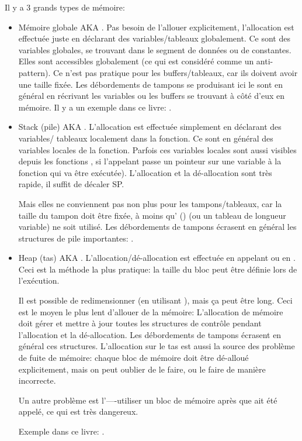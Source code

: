 ﻿

Il y a 3 grands types de mémoire:

\begin{itemize}
\item
Mémoire globale \ac{AKA} .
Pas besoin de l'allouer explicitement, l'allocation est effectuée juste en déclarant
des variables/tableaux globalement.
Ce sont des variables globales, se trouvant dans le segment de données ou de constantes.
Elles sont accessibles globalement (ce qui est considéré comme un \gls{anti-pattern}).
Ce n'est pas pratique pour les buffers/tableaux, car ils doivent avoir une taille
fixée.
Les débordements de tampons se produisant ici le sont en général en récrivant les
variables ou les buffers se trouvant à côté d'eux en mémoire.
Il y a un exemple dans ce livre: .

\item
Stack (pile) \ac{AKA} .
L'allocation est effectuée simplement en déclarant des variables/ tableaux localement
dans la fonction.
Ce sont en général des variables locales de la fonction.
Parfois ces variables locales sont aussi visibles depuis les fonctions ,
si l'appelant passe un pointeur sur une variable à la fonction 
qui va être exécutée).
L'allocation et la dé-allocation sont très rapide, il suffit de décaler \ac{SP}.

Mais elles ne conviennent pas non plus pour les tampons/tableaux, car la taille du
tampon doit être fixée, à moins qu' () (ou un tableau de
longueur variable) ne soit utilisé.
Les débordements de tampons écrasent en général les structures de pile importantes:
.

\item
Heap (tas) \ac{AKA} .
L'allocation/dé-allocation est effectuée en appelant  ou
 en \Cpp.
Ceci est la méthode la plus pratique: la taille du bloc peut être définie lors de
l'exécution.

Il est possible de redimensionner (en utilisant ), mais ça peut
être long.
Ceci est le moyen le plus lent d'allouer de la mémoire:
L'allocation de mémoire doit gérer et mettre à jour toutes les structures de
contrôle pendant l'allocation et la dé-allocation.
Les débordements de tampons écrasent en général ces structures.
L'allocation sur le tas est aussi la source des problème de fuite de mémoire: chaque
bloc de mémoire doit être dé-alloué explicitement, mais on peut oublier de le faire,
ou le faire de manière incorrecte.

Un autre problème est l'----utiliser un bloc de
mémoire après que   ait été appelé, ce qui est très dangereux.

Exemple dans ce livre: .

\end{itemize}
